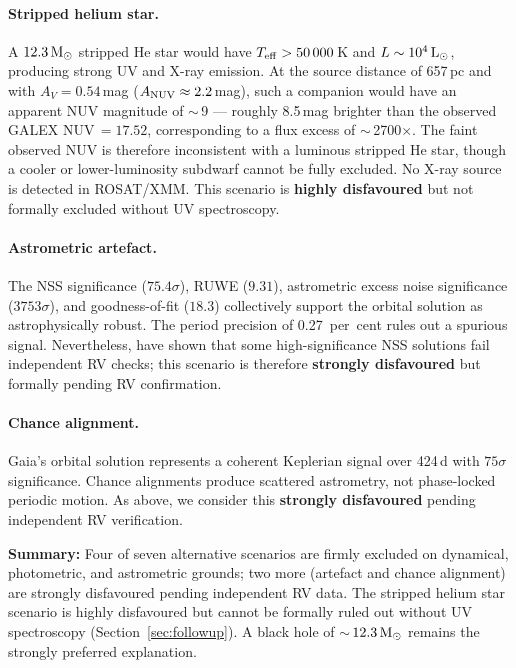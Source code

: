\documentclass[usenatbib,fleqn]{mnras}
\newcommand{\Msun}{{\rm M}_\odot}
\newcommand{\Lsun}{{\rm L}_\odot}
\begin{document}
\paragraph{Stripped helium star.}
A $12.3\,\Msun$ stripped He star would have
$T_{\rm eff} > 50\,000$\,K and $L \sim 10^4\,\Lsun$, producing
strong UV and X-ray emission.  At the source distance of
657\,pc and with $A_V = 0.54$\,mag ($A_{\rm NUV} \approx
2.2$\,mag), such a companion would have an apparent NUV
magnitude of $\sim$\,9 --- roughly 8.5\,mag brighter than the
observed GALEX NUV\,$= 17.52$, corresponding to a flux excess
of $\sim$\,2700$\times$.  The faint observed NUV is therefore
inconsistent with a luminous stripped He star, though a cooler
or lower-luminosity subdwarf cannot be fully excluded.
No X-ray source is detected in ROSAT/XMM.  This
scenario is \textbf{highly disfavoured} but not formally excluded
without UV spectroscopy.

\paragraph{Astrometric artefact.}
The NSS significance ($75.4\sigma$), RUWE ($9.31$), astrometric
excess noise significance ($3753\sigma$), and goodness-of-fit
($18.3$) collectively support the orbital solution as
astrophysically robust.  The period precision of 0.27~per~cent
rules out a spurious signal.  Nevertheless,
\citet{ElBadry2024} have shown that some high-significance NSS
solutions fail independent RV checks; this scenario is therefore
\textbf{strongly disfavoured} but formally pending RV
confirmation.

\paragraph{Chance alignment.}
Gaia's orbital solution represents a coherent Keplerian signal
over 424\,d with $75\sigma$ significance.  Chance alignments
produce scattered astrometry, not phase-locked periodic motion.
As above, we consider this \textbf{strongly disfavoured} pending
independent RV verification.

\medskip\noindent
\textbf{Summary:} Four of seven alternative scenarios are firmly
excluded on dynamical, photometric, and astrometric grounds; two
more (artefact and chance alignment) are strongly disfavoured
pending independent RV data.  The stripped helium star scenario is
highly disfavoured but cannot be formally ruled out without UV
spectroscopy (Section~\ref{sec:followup}).  A black hole of
$\sim$\,$12.3\,\Msun$ remains the strongly preferred explanation.
\end{document}
